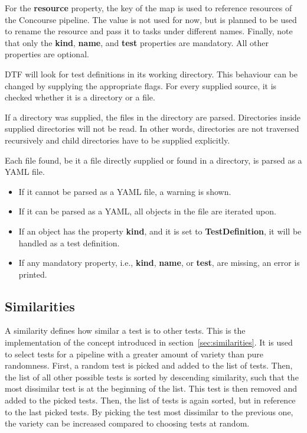 For the \textbf{resource} property, the key of the map is used to reference resources of the Concourse pipeline.
The value is not used for now, but is planned to be used to rename the resource and pass it to tasks under different names.
Finally, note that only the \textbf{kind}, \textbf{name}, and \textbf{test} properties are mandatory.
All other properties are optional.

DTF will look for test definitions in its working directory.
This behaviour can be changed by supplying the appropriate flags.
For every supplied source, it is checked whether it is a directory or a file.

If a directory was supplied, the files in the directory are parsed.
Directories inside supplied directories will not be read.
In other words, directories are not traversed recursively and child directories have to be supplied explicitly.

Each file found, be it a file directly supplied or found in a directory, is parsed as a YAML file.
\begin{itemize}
  \item If it cannot be parsed as a YAML file, a warning is shown.
  \item If it can be parsed as a YAML, all objects in the file are iterated upon.
  \item If an object has the property \textbf{kind}, and it is set to \textbf{TestDefinition}, it will be handled as a test definition.
  \item If any mandatory property, i.e., \textbf{kind}, \textbf{name}, or \textbf{test}, are missing, an error is printed.
\end{itemize}

\subsection{Similarities}\label{subsec:similarities}

A similarity defines how similar a test is to other tests.
This is the implementation of the concept introduced in section~\ref{sec:similarities}.
It is used to select tests for a pipeline with a greater amount of variety than pure randomness.
First, a random test is picked and added to the list of tests.
Then, the list of all other possible tests is sorted by descending similarity, such that the most dissimilar test is at the beginning of the list.
This test is then removed and added to the picked tests.
Then, the list of tests is again sorted, but in reference to the last picked tests.
By picking the test most dissimilar to the previous one, the variety can be increased compared to choosing tests at random.

